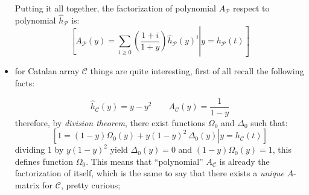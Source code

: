 \begin{itemize}
        Putting it all together, the factorization of polynomial 
        $A_{\mathcal{P}}$ respect to polynomial $\hat{h}_{\mathcal{P}}$ is:
        \begin{displaymath}
                \left.\left[
                    A_{\mathcal{P}}(y) = \sum_{i \geq0}{\left(\frac{1+i}{1+y}\right)
                        \hat{h}_{\mathcal{P}}(y)^{i}} \right| y = h_{\mathcal{P}}(t) \right]
        \end{displaymath}

    \item for Catalan array $\mathcal{C}$ things are quite interesting,
        first of all recall the following facts:

        \begin{displaymath} 
            \hat{h}_{\mathcal{C}}(y)=y-y^2 \quad\quad 
                A_{\mathcal{C}}(y)=\frac{1}{1-y}
        \end{displaymath} 
        therefore, by \emph{division theorem}, 
        there exist functions $\Omega_{0}$ and $\Delta_{0}$ such that:
        \begin{displaymath}
            \left.\left[
                1 = (1-y)\Omega_{0}(y) + y(1-y)^{2}\,\Delta_{0}(y) 
                    \right| y = h_{\mathcal{C}}(t) \right]
        \end{displaymath}
        dividing $1$ by $y(1-y)^2$ yield $\Delta_{0}(y)=0$ 
        and $(1-y)\Omega_{0}(y)=1$, this defines function $\Omega_{0}$. 
        This means that ``polynomial'' $A_{\mathcal{C}}$ is already
        the factorization of itself, which is the same to say that
        there exists a \emph{unique} $A$-matrix for $\mathcal{C}$, pretty curious;


\end{itemize}
